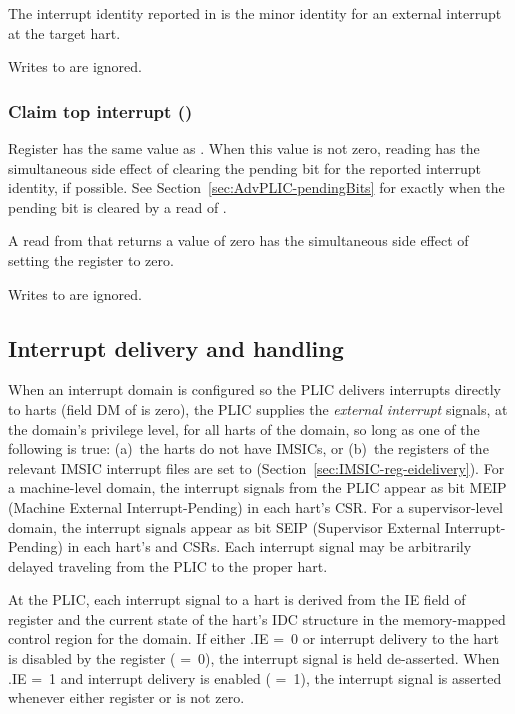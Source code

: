 The interrupt identity reported in  is the minor identity for
an external interrupt at the target hart.

Writes to  are ignored.

\subsubsection{Claim top interrupt ()}

Register  has the same value as .
When this value is not zero, reading  has the simultaneous
side effect of clearing the pending bit for the reported interrupt
identity, if possible.
See Section~\ref{sec:AdvPLIC-pendingBits} for exactly when the pending
bit is cleared by a read of .

A read from  that returns a value of zero has the simultaneous
side effect of setting the  register to zero.

Writes to  are ignored.

\subsection{Interrupt delivery and handling}
\label{sec:AdvPLIC-directMode-intrDelivery}

When an interrupt domain is configured so the PLIC delivers interrupts
directly to harts (field DM of  is zero), the PLIC
supplies the \emph{external interrupt} signals, at the domain's
privilege level, for all harts of the domain, so long as one of the
following is true:
(a)~the harts do not have IMSICs, or
(b)~the  registers of the relevant IMSIC interrupt files
are set to  (Section~\ref{sec:IMSIC-reg-eidelivery}).
For a machine-level domain, the interrupt signals from the PLIC appear
as bit MEIP (Machine External Interrupt-Pending) in each hart's 
CSR.
For a supervisor-level domain, the interrupt signals appear as bit
SEIP (Supervisor External Interrupt-Pending) in each hart's  and
 CSRs.
Each interrupt signal may be arbitrarily delayed traveling from the
PLIC to the proper hart.

At the PLIC, each interrupt signal to a hart is derived from the IE
field of register  and the current state of the hart's IDC
structure in the memory-mapped control region for the domain.
If either .IE =~0 or interrupt delivery to the hart
is disabled by the  register ( =~0), the
interrupt signal is held de-asserted.
When .IE =~1 and interrupt delivery is enabled
( =~1), the interrupt signal is asserted whenever either
register  or  is not zero.

